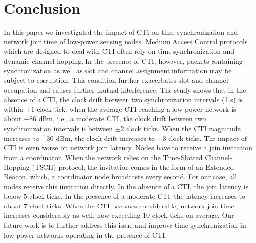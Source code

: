 \section{Conclusion}
\label{sec:conclusion}

In this paper we investigated the impact of CTI on time synchronization and network join time of low-power sensing nodes. Medium Access Control protocols which are designed to deal with CTI often rely on time synchronization and dynamic channel hopping. In the presence of CTI, however, packets containing synchronization as well as slot and channel assignment information may be subject to corruption. This condition further exacerbates slot and channel occupation and causes further mutual interference. The study shows that in the absence of a CTI, the clock drift between two synchronization intervals (1 s) is within $\pm 1$ clock tick. when the average CTI reaching a low-power network is about $-86$ dBm, i.e., a moderate CTI, the clock drift between two synchronization intervals is between $\pm 2$ clock ticks. When the CTI magnitude increases to $-30$ dBm, the clock drift increases to $\pm 3$ clock ticks. The impact of CTI is even worse on network join latency. Nodes have to receive a join invitation from a coordinator. When the network relies on the Time-Slotted Channel-Hopping (TSCH) protocol, the invitation comes in the form of an Extended Beacon, which, a coordinator node broadcasts every second. For our case, all nodes receive this invitation directly. In the absence of a CTI, the join latency is below 5 clock ticks. In the presence of a moderate CTI, the latency increases to about 7  clock ticks. When the CTI becomes considerable, network join time increases considerably as well, now exceeding 10 clock ticks on average. Our future work is to further address this issue and improve time synchronization in low-power networks operating in the presence of CTI. 